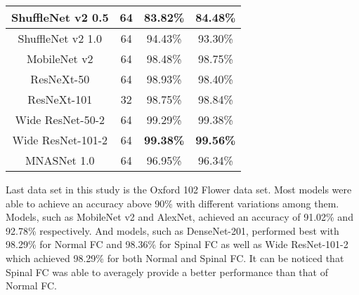\documentclass[conference]{IEEEtran}
\begin{document}
\begin{table}
\begin{tabular}{|c|c|c|c|}
    \hline ShuffleNet v2 0.5   & 64 & 83.82\%  & 84.48\% \\  
    \hline ShuffleNet v2 1.0   & 64 & 94.43\%  & 93.30\% \\   
    \hline MobileNet v2 &  64  & 98.48\% & 98.75\% \\
    \hline ResNeXt-50   & 64   & 98.93\% & 98.40\% \\
    \hline ResNeXt-101  & 32   & 98.75\% & 98.84\% \\    
    \hline Wide ResNet-50-2    & 64      & 99.29\%  & 99.38\% \\
    \hline Wide ResNet-101-2   & 64      & \textbf{99.38\%}  & \textbf{99.56\%} \\
    \hline MNASNet 1.0         & 64      & 96.95\%           & 96.34\% \\
    \hline
\end{tabular} 
\end{table}

Last data set in this study is the Oxford 102 Flower data set. Most models were able to achieve an accuracy above 90\% with different variations among them. Models, such as MobileNet v2 and AlexNet, achieved an accuracy of 91.02\% and 92.78\% respectively. And models, such as DenseNet-201, performed best with 98.29\% for Normal FC and 98.36\% for Spinal FC as well as Wide ResNet-101-2 which achieved 98.29\% for both Normal and Spinal FC. It can be noticed that Spinal FC was able to averagely provide a better performance than that of Normal FC.
\end{document}

